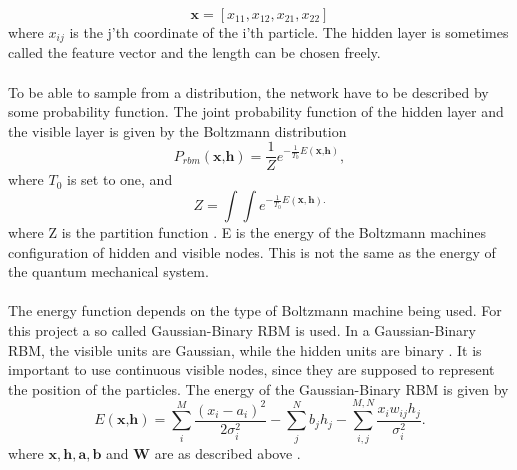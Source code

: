 \begin{equation}
    \boldsymbol{x} = [x_{11}, x_{12}, x_{21}, x_{22}]
\end{equation}
where $x_{ij}$ is the j'th coordinate of the i'th particle. The hidden layer is sometimes called the feature vector and the length can be chosen freely. 
\\
\\
To be able to sample from a distribution, the network have to be described by some probability function. The joint probability function of the hidden layer and the visible layer is given by the Boltzmann distribution
\begin{equation}
    P_{rbm}(\textbf{x,h}) = \frac{1}{Z}e^{-\frac{1}{T_0}E(\textbf{x,h})},
\end{equation}
where $T_0$ is set to one, and 
\begin{equation}
    Z = \int\int e^{-\frac{1}{T_0}E(\boldsymbol{x,h}).}
\end{equation}
where Z is the partition function \cite{mhj_ml}. E is the energy of the Boltzmann machines configuration of hidden and visible nodes. This is not the same as the energy of the quantum mechanical system. 
\\
\\
The energy function depends on the type of Boltzmann machine being used. For this project a so called Gaussian-Binary RBM is used. In a Gaussian-Binary RBM, the visible units are Gaussian, while the hidden units are binary \cite{mhj_ml}. It is important to use continuous visible nodes, since they are supposed to represent the position of the particles.  
The energy of the Gaussian-Binary RBM is given by
\begin{equation}
E(\textbf{x,h}) = \sum_i^M\frac{(x_i - a_i)^2}{2\sigma_i^2} - \sum_j^N b_jh_j - \sum_{i,j}^{M,N}\frac{x_i w_{ij}h_j}{\sigma_i^2}.
\end{equation}
where $\boldsymbol{x, h, a, b}$ and $\boldsymbol{W}$ are as described above \cite{mhj_ml}. 
